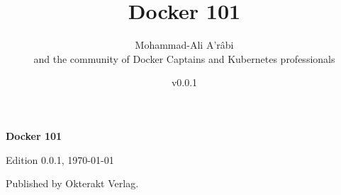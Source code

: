 \newcommand{\bookversion}{0.0.1}

\title{\bfseries {Docker 101}}
\author{Mohammad-Ali A'râbi\\and the community of Docker Captains and Kubernetes professionals}
\date{v\bookversion}

\maketitle

\newpage

\textbf{Docker 101}

Edition \bookversion, \today

Published by Okterakt Verlag.

\newpage